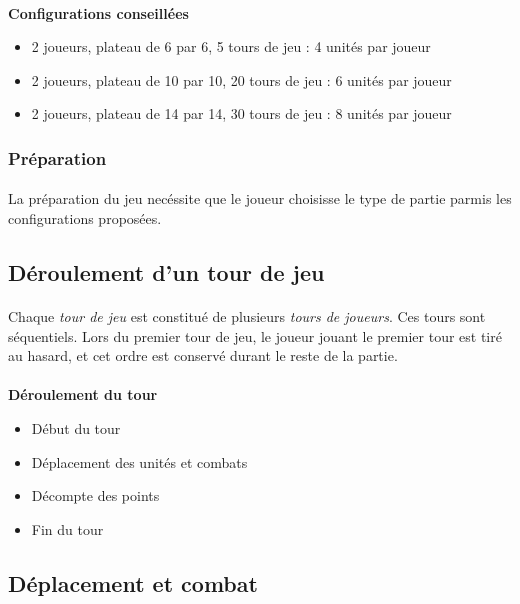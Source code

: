 \documentclass[a4paper]{article}
\begin{document}
\paragraph{}
\textbf{Configurations conseillées}
\begin{itemize}
    \item 2 joueurs, plateau de 6 par 6, 5 tours de jeu : 4 unités par joueur
    \item 2 joueurs, plateau de 10 par 10, 20 tours de jeu : 6 unités par joueur
    \item 2 joueurs, plateau de 14 par 14, 30 tours de jeu : 8 unités par joueur
\end{itemize}

\subsubsection{Préparation}
\paragraph{}
La préparation du jeu necéssite que le joueur choisisse le type de partie parmis les configurations proposées. 

\subsection{Déroulement d'un tour de jeu}
\paragraph{}
Chaque \textit{tour de jeu} est constitué de plusieurs \textit{tours de joueurs}. Ces tours sont séquentiels. Lors du premier tour de jeu, le joueur jouant le premier tour est tiré au hasard, et cet ordre est conservé durant le reste de la partie.

\paragraph{}
\textbf{Déroulement du tour}
\begin{itemize}
    \item Début du tour
    \item Déplacement des unités et combats
    \item Décompte des points
    \item Fin du tour
\end{itemize}

\subsection{Déplacement et combat}
\end{document}
